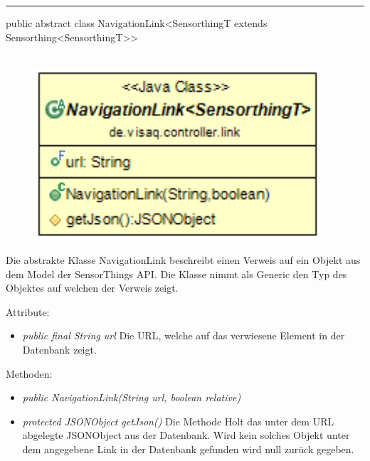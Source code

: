\rule{\textwidth}{0.4pt}
public abstract class NavigationLink<SensorthingT extends Sensorthing<SensorthingT>>
\\\\
\begin{minipage}{0.4\textwidth}
    \begin{figure}[H]
        {\centering\includegraphics[width=0.95\textwidth]{media/backend/controller/classes/NavigationLink.png}}
    \end{figure}
    \end{minipage} \hfill
\begin{minipage}{0.6\textwidth}
    Die abstrakte Klasse NavigationLink beschreibt einen Verweis auf ein Objekt aus dem Model der \gls{SensorThings API}.
    Die Klasse nimmt als Generic den Typ des Objektes auf welchen der Verweis zeigt.
\end{minipage}

Attribute:
\begin{itemize}
    \item \emph{public final String url} Die URL, welche auf das verwiesene Element in der Datenbank zeigt.
\end{itemize}
Methoden:
\begin{itemize}
    \item \emph{public NavigationLink(String url, boolean relative)}
    \relativeDescription
    \item \emph{protected JSONObject getJson()} Die Methode Holt das unter dem URL abgelegte JSONObject aus der Datenbank.
    Wird kein solches Objekt unter dem angegebene Link in der Datenbank gefunden wird null zurück gegeben.
\end{itemize}

